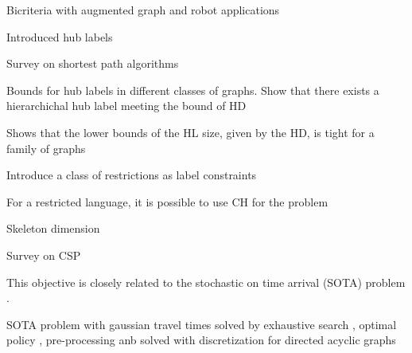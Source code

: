 Bicriteria with augmented graph and robot applications \cite{alex_bicriteria}

Introduced hub labels\cite{cohen_definition_hl}

Survey on shortest path algorithms \cite{goldberg_survey}

Bounds for hub labels in different classes of graphs. 
Show that there exists a hierarchichal hub label meeting the bound of HD \cite{babenko_hl_complexity}

Shows that the lower bounds of the HL size, given by the HD, is tight for a family of graphs \cite{white_complexity_hd}

Introduce a class of restrictions as label constraints \cite{language_csp}

For a restricted language, it is possible to use CH for the problem \cite{rice_csp}

Skeleton dimension \cite{skeleton}

Survey on CSP \cite{csp_survey}

This objective is closely related to the stochastic on time arrival (SOTA) problem \cite{fan2005arriving}.

SOTA problem with gaussian travel times solved by exhaustive search \cite{nikolova_gaussian}, optimal policy \cite{samaranayake2012speedup}, pre-processing \cite{sabran2014precomputation} anb solved with discretization for directed acyclic graphs \cite{nikolova_discretization}